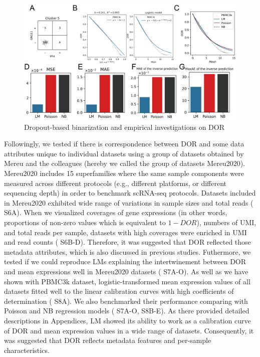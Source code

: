 \documentclass{article}
\begin{document}
\begin{figure}[htb]
  \centering
  \includegraphics[scale=0.8]{./figs/exported/logisticmodel.png}
  \caption{Dropout-based binarization and empirical investigations on DOR}
  \label{logistic model}
\end{figure}

Followingly, we tested if there is correspondence between DOR and some data attributes unique to individual 
datasets using a group of datasets obtained by Mereu and the colleagues\cite{mereu2020benchmarking} (hereby we called the group of 
datasets Mereu2020). Mereu2020 includes 15 superfamilies where the same sample components were measured 
across different protocols (e.g., different platforms, or different sequencing depth) in order to benchmark scRNA-seq 
protocols\cite{mereu2020benchmarking}. Datasets included in Mereu2020 exhibited wide range of variations in sample sizes and total reads 
(\figurename{ S6A}). When we visualized coverages of gene expressions (in other words, proportions of non-zero values 
which is equivalent to $1-DOR$), numbers of \ac{UMI}, and total reads per sample, datasets 
with high coverages were enriched in UMI and read counts (\figurename{ S6B-D}). Therefore, it was suggested that DOR 
reflected those metadata attributes, which is also discussed in previous studies\cite{qiu2020embracing}. Futhermore, we tested if we could 
reproduce LMs explaining the intertwinement between DOR and mean expressions well in Mereu2020 datasets 
(\figurename{ S7A-O}). As well as we have shown with PBMC3k dataset, logistic-transformed mean expression values 
of all datasets fitted well to the linear calibration curves with high coefficients of determination (\figurename{ S8A}). We also 
benchmarked their performance comparing with Poisson and NB regression models (\figurename{ S7A-O, S8B-E}). 
As there provided detailed descriptions in Appendices, LM showed its ability to work as a calibration curve of DOR 
and mean expression values in a wide range of datasets. Consequently, it was suggested that DOR reflects metadata features 
and per-sample characteristics.
\end{document}
